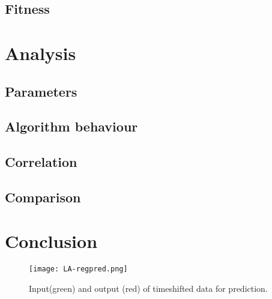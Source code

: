\documentclass[conference]{IEEEtran}
\begin{document}
\subsection{Fitness}



\section{Analysis}
\subsection{Parameters}

\subsection{Algorithm behaviour}

\subsection{Correlation}

\subsection{Comparison}


\section{Conclusion}


\begin{figure}[!t] 
\centering 
\texttt{[image: LA-regpred.png]} 
\caption{Input(green) and output (red) of timeshifted data for prediction.} 
\label{fig:timeshift} 
\end{figure}
\end{document}
